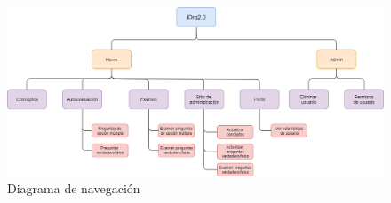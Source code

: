 \begin{figure}[!ht]
  \begin{center}
    \includegraphics[width=1\textwidth]{../images/diagrama_navegacion.png}
    \caption{Diagrama de navegación}
    \label{fig:diagrama_navegacion}
  \end{center}
\end{figure}


